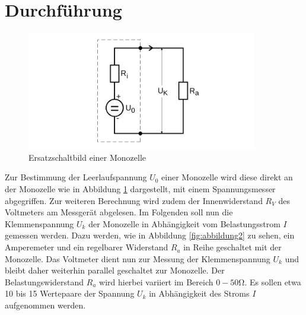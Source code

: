 
\section{Durchführung}
\label{sec:Durchführung}
\begin{figure}[H]
  \centering
  \includegraphics[width=0.9\textwidth]{Bilder/Abbildung1.png}
  \caption{Ersatzschaltbild einer Monozelle \cite{Anleitung}}
  \label{fig:abbildung1}
\end{figure}
Zur Bestimmung der Leerlaufspannung $U_0$ einer Monozelle wird diese direkt an der Monozelle wie in Abbildung \ref{fig:abbildung1} dargestellt, mit einem Spannungsmesser abgegriffen.
Zur weiteren Berechnung wird zudem der Innenwiderstand $R_V$ des Voltmeters am Messgerät abgelesen.
Im Folgenden soll nun die Klemmenspannung $U_k$ der Monozelle in Abhängigkeit vom Belastungsstrom $I$ gemessen werden.
Dazu werden, wie in Abbildung \ref{fig:abbildung2} zu sehen, ein Amperemeter und ein regelbarer Widerstand $R_a$ in Reihe geschaltet mit der Monozelle. Das Voltmeter dient nun zur Messung der Klemmenspannung $U_k$ und bleibt daher weiterhin parallel geschaltet zur Monozelle.
Der Belastungswiderstand $R_a$ wird hierbei variiert im Bereich $0-50\si{\ohm}$.
Es sollen etwa 10 bis 15 Wertepaare der Spannung $U_k$ in Abhängigkeit des Stroms $I$ aufgenommen werden.




